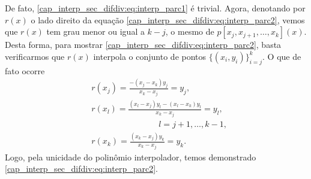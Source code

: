De fato, \eqref{cap_interp_sec_difdiv:eq:interp_parc1} é trivial. Agora, denotando por $r(x)$ o lado direito da equação \eqref{cap_interp_sec_difdiv:eq:interp_parc2}, vemos que $r(x)$ tem grau menor ou igual a $k-j$, o mesmo de $p[x_j, x_{j+1}, \ldots, x_k](x)$. Desta forma, para mostrar \eqref{cap_interp_sec_difdiv:eq:interp_parc2}, basta verificarmos que $r(x)$ interpola o conjunto de pontos $\{(x_i, y_i)\}_{i=j}^k$. O que de fato ocorre
\begin{subequations}
  \begin{align}
    &r(x_j) = \frac{-(x_j-x_k)y_j}{x_k-x_j} = y_j,\\
    &r(x_{l}) = \frac{(x_l-x_j)y_l-(x_l-x_k)y_l}{x_k-x_j}=y_l,\nonumber\\
    &\qquad\qquad\qquad\qquad l=j+1,\dotsc,k-1,\\
    &r(x_k) = \frac{(x_k-x_j)y_k}{x_k-x_j}=y_k.
  \end{align}
\end{subequations}
Logo, pela unicidade do polinômio interpolador, temos demonstrado \eqref{cap_interp_sec_difdiv:eq:interp_parc2}.

